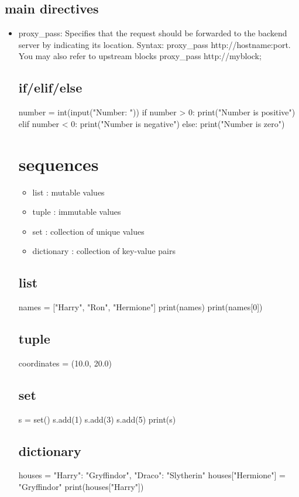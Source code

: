 \documentclass[12pt]{article}
\begin{document}
\subsection{main directives}
\begin{itemize}
	\item proxy_pass: Specifies that the request should be forwarded to
		the backend server by indicating its location. Syntax:
		proxy_pass http://hostname:port. You may also refer to upstream blocks
		proxy_pass http://myblock;


\subsection{if/elif/else}
number = int(input("Number: "))
if number > 0:
    print("Number is positive")
elif number < 0:
    print("Number is negative")
else:
    print("Number is zero")

\section{sequences}
\begin{itemize}
    \item list : mutable values
    \item tuple : immutable values
    \item set : collection of unique values
    \item dictionary : collection of key-value pairs
\end{itemize}

\subsection{list}
names = ["Harry", "Ron", "Hermione"]
print(names)
print(names[0])
\subsection{tuple}
coordinates = (10.0, 20.0)
\subsection{set}
s = set()
s.add(1)
s.add(3)
s.add(5)
print(s)

\subsection{dictionary}
houses = {"Harry": "Gryffindor", "Draco": "Slytherin"}
houses["Hermione"] = "Gryffindor"
print(houses["Harry"])


\end{itemize}
\end{document}
